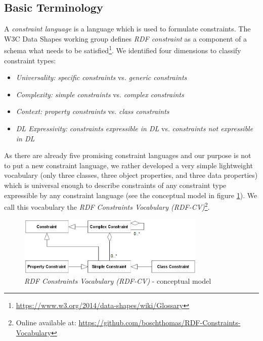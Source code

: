 \documentclass[a4paper,fontsize=11pt]{scrartcl}
\begin{document}
\subsection{Basic Terminology}

A \emph{constraint language} is a language which is used to formulate constraints.
The W3C Data Shapes working group defines \emph{RDF constraint} as a component of a schema what needs to be satisfied\footnote{\url{https://www.w3.org/2014/data-shapes/wiki/Glossary}}.
We identified four dimensions to classify constraint types:
\begin{itemize}
  \item \emph{Universality:} \emph{specific constraints} vs. \emph{generic constraints}
	\item \emph{Complexity:} \emph{simple constraints} vs. \emph{complex constraints}
	\item \emph{Context:} \emph{property constraints} vs. \emph{class constraints}
	\item \emph{DL Expressivity:} \emph{constraints expressible in DL} vs. \emph{constraints not expressible in DL}
\end{itemize}

As there are already five promising constraint languages and our purpose is not to put a new constraint language, we rather developed a very simple lightweight vocabulary (only three classes, three object properties, and three data properties) which is universal enough to describe constraints of any constraint type expressible by any constraint language (see the conceptual model in figure \ref{fig:RDF-CV-conceptual-model}).
We call this vocabulary the \emph{RDF Constraints Vocabulary (RDF-CV)}\footnote{Online available at: \url{https://github.com/boschthomas/RDF-Constraints-Vocabulary}}.

\begin{figure}
	\centering
		\includegraphics[width=0.80\textwidth]{images/RDF-CV-conceptual-model.png}
	\caption{\emph{RDF Constraints Vocabulary (RDF-CV)} - conceptual model}
	\label{fig:RDF-CV-conceptual-model}
\end{figure}
\end{document}
